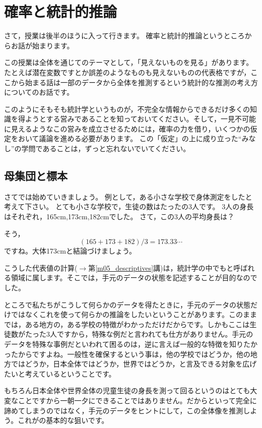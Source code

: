\documentclass{ltjsbook}
\begin{document}
\chapter{確率と統計的推論}
\label{m16_inference}
さて，授業は後半のほうに入って行きます。
確率と統計的推論というところからお話が始まります。

この授業は全体を通じてのテーマとして，「見えないものを見る」があります。
たとえば潜在変数ですとか誤差のようなものも見えないものの代表格ですが，ここから始まる話は一部のデータから全体を推測するという統計的な推測の考え方についてのお話です。

このようにそもそも統計学というものが，不完全な情報からできるだけ多くの知識を得ようとする営みであることを知っておいてください。そして，一見不可能に見えるようなこの営みを成立させるためには，確率の力を借り，いくつかの仮定をおいて議論を進める必要があります。
この「仮定」の上に成り立った``みなし''の学問であることは，ずっと忘れないでいてください。

\section{母集団と標本}
さてでは始めていきましょう。
例として，ある小さな学校で身体測定をしたと考えて下さい。
とても小さな学校で，生徒の数はたったの3人です。
3人の身長はそれぞれ，165cm,173cm,182cmでした。
さて，この3人の平均身長は？

そう，
\[ (165+173+182)/3=173.33\cdots\]
ですね。大体173cmと結論づけましょう。

こうした代表値の計算($\to$第\ref{m05_descriptives}講)は，統計学の中でもと呼ばれる領域に属します。そこでは，手元のデータの状態を記述することが目的なのでした。

ところで私たちがこうして何らかのデータを得たときに，手元のデータの状態だけではなくこれを使って何らかの推論をしたいということがあります。このままでは，ある地方の，ある学校の特徴がわかっただけだからです。しかもここは生徒数がたった3人ですから，特殊な例だと言われても仕方がありません。手元のデータを特殊な事例だといわれて困るのは，逆に言えば一般的な特徴を知りたかったからですよね。一般性を確保するという事は，他の学校ではどうか，他の地方ではどうか，日本全体ではどうか，世界ではどうか，と言及できる対象を広げたいと考えているということです。

もちろん日本全体や世界全体の児童生徒の身長を測って回るというのはとても大変なことですから一朝一夕にできることではありません。だからといって完全に諦めてしまうのではなく，手元のデータをヒントにして，この全体像を推測しよう。これがの基本的な狙いです。
\end{document}

